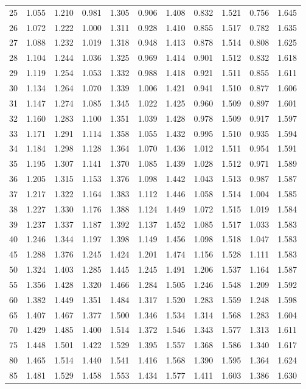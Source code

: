 \documentclass[12pt]{article}
\begin{document}
\begin{table}
\begin{center}
{\begin{tabular}{|c|c|c|c|c|c|c|c|c|c|c|}
	25&1.055&1.210&0.981&1.305&0.906&1.408&0.832&1.521&0.756&1.645\\
	26&1.072&1.222&1.000&1.311&0.928&1.410&0.855&1.517&0.782&1.635\\
	27&1.088&1.232&1.019&1.318&0.948&1.413&0.878&1.514&0.808&1.625\\
	28&1.104&1.244&1.036&1.325&0.969&1.414&0.901&1.512&0.832&1.618\\
	29&1.119&1.254&1.053&1.332&0.988&1.418&0.921&1.511&0.855&1.611\\
	30&1.134&1.264&1.070&1.339&1.006&1.421&0.941&1.510&0.877&1.606\\
	31&1.147&1.274&1.085&1.345&1.022&1.425&0.960&1.509&0.897&1.601\\
	32&1.160&1.283&1.100&1.351&1.039&1.428&0.978&1.509&0.917&1.597\\
	33&1.171&1.291&1.114&1.358&1.055&1.432&0.995&1.510&0.935&1.594\\
	34&1.184&1.298&1.128&1.364&1.070&1.436&1.012&1.511&0.954&1.591\\
	35&1.195&1.307&1.141&1.370&1.085&1.439&1.028&1.512&0.971&1.589\\
	36&1.205&1.315&1.153&1.376&1.098&1.442&1.043&1.513&0.987&1.587\\
	37&1.217&1.322&1.164&1.383&1.112&1.446&1.058&1.514&1.004&1.585\\
	38&1.227&1.330&1.176&1.388&1.124&1.449&1.072&1.515&1.019&1.584\\
	39&1.237&1.337&1.187&1.392&1.137&1.452&1.085&1.517&1.033&1.583\\
	40&1.246&1.344&1.197&1.398&1.149&1.456&1.098&1.518&1.047&1.583\\
	45&1.288&1.376&1.245&1.424&1.201&1.474&1.156&1.528&1.111&1.583\\
	50&1.324&1.403&1.285&1.445&1.245&1.491&1.206&1.537&1.164&1.587\\
	55&1.356&1.428&1.320&1.466&1.284&1.505&1.246&1.548&1.209&1.592\\
	60&1.382&1.449&1.351&1.484&1.317&1.520&1.283&1.559&1.248&1.598\\
	65&1.407&1.467&1.377&1.500&1.346&1.534&1.314&1.568&1.283&1.604\\
	70&1.429&1.485&1.400&1.514&1.372&1.546&1.343&1.577&1.313&1.611\\
	75&1.448&1.501&1.422&1.529&1.395&1.557&1.368&1.586&1.340&1.617\\
	80&1.465&1.514&1.440&1.541&1.416&1.568&1.390&1.595&1.364&1.624\\
	85&1.481&1.529&1.458&1.553&1.434&1.577&1.411&1.603&1.386&1.630\\

\end{tabular}}
\end{center}
\end{table}
\end{document}
